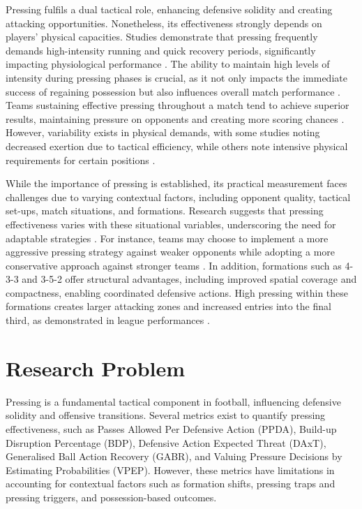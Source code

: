 Pressing fulfils a dual tactical role, enhancing defensive solidity and creating attacking opportunities. Nonetheless, its effectiveness strongly depends on players' physical capacities. Studies demonstrate that pressing frequently demands high-intensity running and quick recovery periods, significantly impacting physiological performance \citep{bortnik_mean_2022, ju_contextualised_2023}. The ability to maintain high levels of intensity during pressing phases is crucial, as it not only impacts the immediate success of regaining possession but also influences overall match performance \citep{carr_differences_2020, fernandez-navarro_evaluating_2019}. Teams sustaining effective pressing throughout a match tend to achieve superior results, maintaining pressure on opponents and creating more scoring chances \citep{liu_characterization_2024, modric_influence_2023}. However, variability exists in physical demands, with some studies noting decreased exertion due to tactical efficiency, while others note intensive physical requirements for certain positions \citep{low_exploring_2018, carr_differences_2020}.

While the importance of pressing is established, its practical measurement faces challenges due to varying contextual factors, including opponent quality, tactical set-ups, match situations, and formations. Research suggests that pressing effectiveness varies with these situational variables, underscoring the need for adaptable strategies \citep{ruan_quantifying_2022, toda_evaluation_2022}. For instance, teams may choose to implement a more aggressive pressing strategy against weaker opponents while adopting a more conservative approach against stronger teams \citep{bauer_putting_2023, forcher_leander_is_2024}. In addition, formations such as 4-3-3 and 3-5-2 offer structural advantages, including improved spatial coverage and compactness, enabling coordinated defensive actions. High pressing within these formations creates larger attacking zones and increased entries into the final third, as demonstrated in league performances \citep{brindescu_study_2021, scotognella_simulations_2021}.

\section{Research Problem}

Pressing is a fundamental tactical component in football, influencing defensive solidity and offensive transitions. Several metrics exist to quantify pressing effectiveness, such as Passes Allowed Per Defensive Action (PPDA), Build-up Disruption Percentage (BDP), Defensive Action Expected Threat (DAxT), Generalised Ball Action Recovery (GABR), and Valuing Pressure Decisions by Estimating Probabilities (VPEP). However, these metrics have limitations in accounting for contextual factors such as formation shifts, pressing traps and pressing triggers, and possession-based outcomes.

